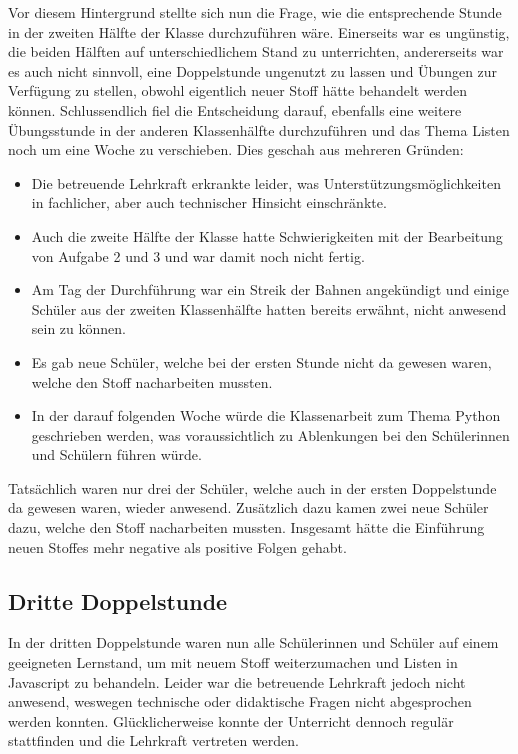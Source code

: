 Vor diesem Hintergrund stellte sich nun die Frage, wie die entsprechende Stunde in der zweiten Hälfte der Klasse durchzuführen wäre.
Einerseits war es ungünstig, die beiden Hälften auf unterschiedlichem Stand zu unterrichten, andererseits war es auch nicht sinnvoll, eine Doppelstunde ungenutzt zu lassen und Übungen zur Verfügung zu stellen, obwohl eigentlich neuer Stoff hätte behandelt werden können.
Schlussendlich fiel die Entscheidung darauf, ebenfalls eine weitere Übungsstunde in der anderen Klassenhälfte durchzuführen und das Thema Listen noch um eine Woche zu verschieben.
Dies geschah aus mehreren Gründen:
\begin{itemize}
	\item Die betreuende Lehrkraft erkrankte leider, was Unterstützungsmöglichkeiten in fachlicher, aber auch technischer Hinsicht einschränkte.
	\item Auch die zweite Hälfte der Klasse hatte Schwierigkeiten mit der Bearbeitung von Aufgabe 2 und 3 und war damit noch nicht fertig.
	\item Am Tag der Durchführung war ein Streik der Bahnen angekündigt und einige Schüler aus der zweiten Klassenhälfte hatten bereits erwähnt, nicht anwesend sein zu können.
	\item Es gab neue Schüler, welche bei der ersten Stunde nicht da gewesen waren, welche den Stoff nacharbeiten mussten.
	\item In der darauf folgenden Woche würde die Klassenarbeit zum Thema Python geschrieben werden, was voraussichtlich zu Ablenkungen bei den Schülerinnen und Schülern führen würde.
\end{itemize}
Tatsächlich waren nur drei der Schüler, welche auch in der ersten Doppelstunde da gewesen waren, wieder anwesend.
Zusätzlich dazu kamen zwei neue Schüler dazu, welche den Stoff nacharbeiten mussten.
Insgesamt hätte die Einführung neuen Stoffes mehr negative als positive Folgen gehabt.


\subsection{Dritte Doppelstunde}
\label{subsec:doppelstunde-3}

In der dritten Doppelstunde waren nun alle Schülerinnen und Schüler auf einem geeigneten Lernstand, um mit neuem Stoff weiterzumachen und Listen in Javascript zu behandeln.
Leider war die betreuende Lehrkraft jedoch nicht anwesend, weswegen technische oder didaktische Fragen nicht abgesprochen werden konnten.
Glücklicherweise konnte der Unterricht dennoch regulär stattfinden und die Lehrkraft vertreten werden.


